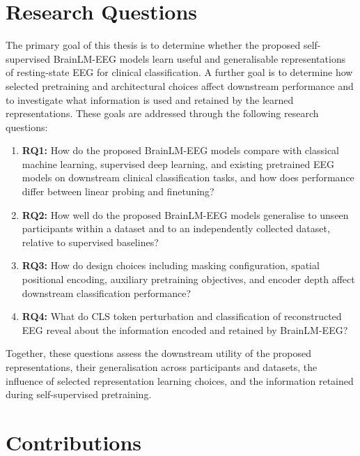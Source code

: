 \section{Research Questions}\label{sec:intro_rqs}

The primary goal of this thesis is to determine whether the proposed self-supervised BrainLM-EEG models learn useful and generalisable representations of resting-state EEG for clinical classification. A further goal is to determine how selected pretraining and architectural choices affect downstream performance and to investigate what information is used and retained by the learned representations. These goals are addressed through the following research questions:

\begin{enumerate}

    \item \textbf{RQ1:} How do the proposed BrainLM-EEG models compare with classical machine learning, supervised deep learning, and existing pretrained EEG models on downstream clinical classification tasks, and how does performance differ between linear probing and finetuning?

    \item \textbf{RQ2:} How well do the proposed BrainLM-EEG models generalise to unseen participants within a dataset and to an independently collected dataset, relative to supervised baselines?

    \item \textbf{RQ3:} How do design choices including masking configuration, spatial positional encoding, auxiliary pretraining objectives, and encoder depth affect downstream classification performance?

    \item \textbf{RQ4:} What do CLS token perturbation and classification of reconstructed EEG reveal about the information encoded and retained by BrainLM-EEG?

\end{enumerate}

Together, these questions assess the downstream utility of the proposed representations, their generalisation across participants and datasets, the influence of selected representation learning choices, and the information retained during self-supervised pretraining.

\section{Contributions}\label{sec:intro_contributions}

